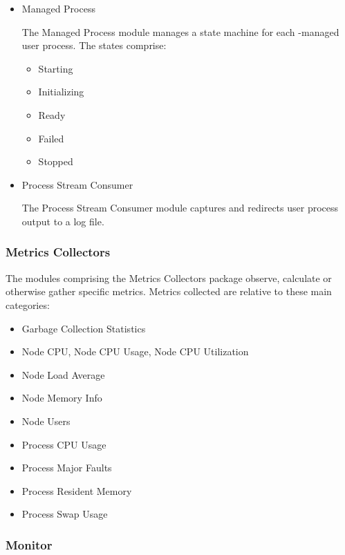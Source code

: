 \begin{itemize}
      \item Managed Process

      The Managed Process module manages a state machine for each
      \varAgent-managed user process.  The states comprise:
      
         \begin{itemize}
           \item Starting
           \item Initializing
           \item Ready
           \item Failed
           \item Stopped
         \end{itemize}
         
      \item Process Stream Consumer
      
      The Process Stream Consumer module captures and redirects user process output
      to a log file.
      
    \end{itemize}  
    
    \subsubsection{Metrics Collectors} 
    
    The modules comprising the Metrics Collectors package observe, calculate
    or otherwise gather specific metrics. Metrics collected are relative to
    these main categories:
        
    \begin{itemize}
      \item Garbage Collection Statistics
      \item Node CPU, Node CPU Usage, Node CPU Utilization
      \item Node Load Average
      \item Node Memory Info
      \item Node Users
      \item Process CPU Usage
      \item Process Major Faults
      \item Process Resident Memory
      \item Process Swap Usage
    \end{itemize}  
    
    \subsubsection{Monitor} 


